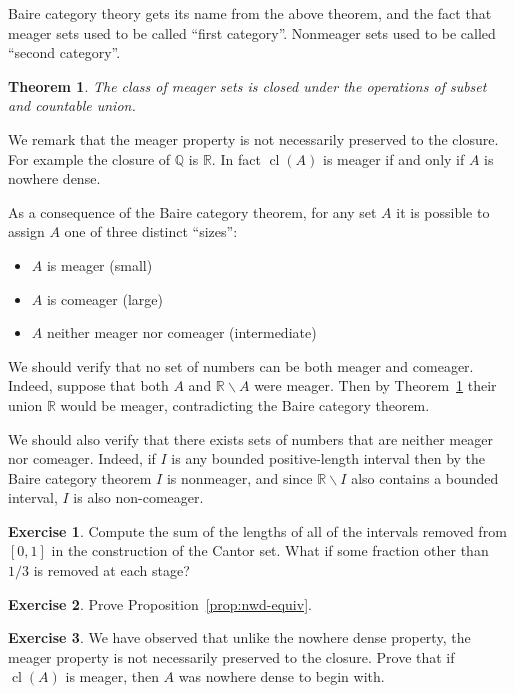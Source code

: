 \documentclass[11pt,oneside]{amsbook}
\newcommand{\Q}{\mathbb Q}
\newcommand{\R}{\mathbb R}
\DeclareMathOperator{\cl}{cl}
\theoremstyle{definition}
\newtheorem{exercise}{Exercise}[section]
\theoremstyle{plain}
\newtheorem{theorem}{Theorem}[section]
\theoremstyle{definition}
\theoremstyle{remark}
\numberwithin{equation}{section}
\numberwithin{figure}{section}
\begin{document}
Baire category theory gets its name from the above theorem, and the fact that meager sets used to be called ``first category''. Nonmeager sets used to be called ``second category''.

\begin{theorem}
  \label{thm:meager-pres}
  The class of meager sets is closed under the operations of subset and countable union.
\end{theorem}

We remark that the meager property is not necessarily preserved to the closure. For example the closure of $\Q$ is $\R$. In fact $\cl(A)$ is meager if and only if $A$ is nowhere dense.

As a consequence of the Baire category theorem, for any set $A$ it is possible to assign $A$ one of three distinct ``sizes'':

\begin{itemize}
  \item $A$ is meager (small)
  \item $A$ is comeager (large)
  \item $A$ neither meager nor comeager (intermediate)
\end{itemize}

We should verify that no set of numbers can be both meager and comeager. Indeed, suppose that both $A$ and $\R\smallsetminus A$ were meager. Then by Theorem~\ref{thm:meager-pres} their union $\R$ would be meager, contradicting the Baire category theorem.

We should also verify that there exists sets of numbers that are neither meager nor comeager. Indeed, if $I$ is any bounded positive-length interval then by the Baire category theorem $I$ is nonmeager, and since $\R\smallsetminus I$ also contains a bounded interval, $I$ is also non-comeager.

\begin{exercise}
  \label{exerc:cantor}
  Compute the sum of the lengths of all of the intervals removed from $[0,1]$ in the construction of the Cantor set. What if some fraction other than $1/3$ is removed at each stage?
\end{exercise}

\begin{exercise}
  \label{exerc:nwd-equiv}
  Prove Proposition~\ref{prop:nwd-equiv}.
\end{exercise}

\begin{exercise}
  We have observed that unlike the nowhere dense property, the meager property is not necessarily preserved to the closure. Prove that if $\cl(A)$ is meager, then $A$ was nowhere dense to begin with.
\end{exercise}
\end{document}
